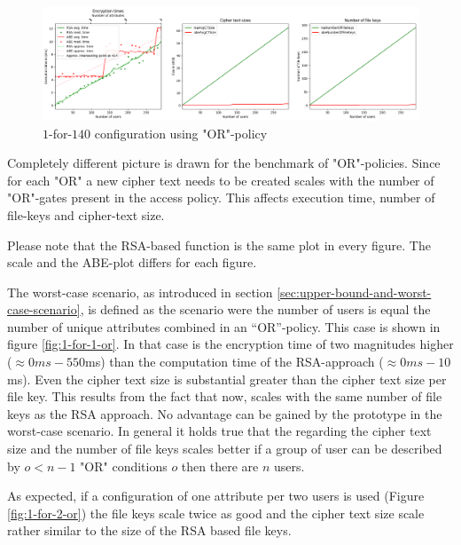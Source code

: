 \begin{figure}[!t]
\centering
    \includegraphics[width=\linewidth]{img/eval-or-policy/encrypt_incrementing_10_attribute_increment_1per140User.png}
    \caption{$1$-for-$140$ configuration using "OR"-policy}
    \label{fig:1-for-140-or}
\end{figure}

Completely different picture is drawn for the benchmark of "OR"-policies. Since for each "OR" a new cipher text needs to be created \name scales with the number of "OR"-gates present in the access policy. This affects execution time, number of file-keys and cipher-text size.




Please note that the RSA-based function is the same plot in every figure. The scale and the ABE-plot differs for each figure.  

The worst-case scenario, as introduced in section \ref{sec:upper-bound-and-worst-case-scenario}, is defined as the scenario were the number of users is equal the number of unique attributes combined in an “OR”-policy. This case is shown in figure \ref{fig:1-for-1-or}. In that case is the encryption time of \name two magnitudes higher ($\approx 0ms-550$ms) than the computation time of the RSA-approach ($\approx 0ms-10$ms). Even the cipher text size is substantial greater than the cipher text size per file key. This results from the fact that now, \name scales with the same number of file keys as the RSA approach. No advantage can be gained by the prototype in the worst-case scenario. In general it holds true that the regarding the cipher text size and the number of file keys \name scales better if a group of user can be described by $o < n -1$ "OR" conditions $o$ then there are $n$ users.

As expected, if a configuration of one attribute per two users is used (Figure \ref{fig:1-for-2-or}) the file keys scale twice as good and the cipher text size scale rather similar to the size of the RSA based file keys. 

